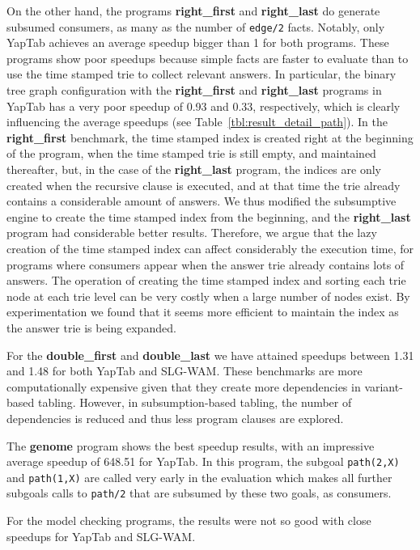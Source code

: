 On the other hand, the programs \textbf{right\_first} and \textbf{right\_last} do generate subsumed consumers,
as many as the number of \texttt{edge/2} facts. Notably, only YapTab
achieves an average speedup bigger than 1 for both programs. These programs show poor speedups because simple facts
are faster to evaluate than to use the time stamped trie to collect relevant answers.
In particular, the binary tree graph configuration with the \textbf{right\_first} and \textbf{right\_last} programs
in YapTab has a very poor speedup of 0.93 and 0.33, respectively, which is clearly influencing the average speedups
(see Table~\ref{tbl:result_detail_path}).
In the \textbf{right\_first} benchmark, the time stamped index is created right at
the beginning of the program, when the time stamped trie is still empty, and maintained thereafter, but,
in the case of the \textbf{right\_last} program, the indices are only created when the recursive
clause is executed, and at that time the trie already contains a considerable amount of answers.
We thus modified the subsumptive
engine to create the time stamped index from the beginning, and the \textbf{right\_last} program had considerable
better results. Therefore, we argue that the lazy creation of the time stamped index can affect considerably the
execution time, for programs where consumers appear when the answer trie already contains lots of answers.
The operation of creating the time stamped index
and sorting each trie node at each trie level can be very costly when a large number of nodes exist.
By experimentation we found that it seems more efficient to maintain the index as the answer trie is being expanded.

For the \textbf{double\_first} and \textbf{double\_last} we have attained speedups between 1.31 and 1.48
for both YapTab and SLG-WAM. These benchmarks are more computationally expensive given that they create more
dependencies in variant-based tabling. However, in subsumption-based tabling, the number of dependencies is reduced 
and thus less program clauses are explored.

The \textbf{genome} program shows the best speedup results, with an impressive average speedup of 
648.51 for YapTab. In this program, the subgoal \texttt{path(2,X)} and \texttt{path(1,X)} are called
very early in the evaluation which makes all further subgoals calls to \texttt{path/2} that are subsumed by these
two goals, as consumers.

For the model checking programs, the results were not so good with close speedups for YapTab and SLG-WAM.


